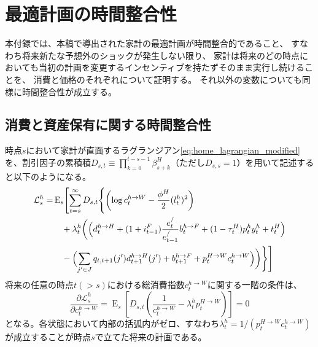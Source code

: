 
\chapter{最適計画の時間整合性}
\label{chap:appendix_time_consistency}

本付録では、本稿で導出された家計の最適計画が時間整合的であること、
すなわち将来新たな予想外のショックが発生しない限り、
家計は将来のどの時点においても当初の計画を変更するインセンティブを持たずそのまま実行し続けることを、
消費と価格のそれぞれについて証明する。
それ以外の変数についても同様に時間整合性が成立する。

\section{消費と資産保有に関する時間整合性}
\label{sec:appendix_time_consistency_sub1}
時点\(s\)において家計が直面するラグランジアン\eqref{eq:home_lagrangian_modified}を、割引因子の累積積\(D_{s,t}\equiv\prod_{k=0}^{t-s-1}\beta_{s+k}^H\)（ただし\(D_{s,s}=1\)）を用いて記述すると以下のようになる。
\begin{equation}
\begin{aligned}
\mathcal{L}_s^h=&\operatorname{E}_s\Biggl[\sum_{t=s}^{\infty}D_{s,t}\Biggl\{\left(\log c_t^{h\to W}-\frac{\phi^H}{2}(l_t^h)^2\right) \\
&\quad+\lambda_t^h\biggl(\Bigl(d_t^{h\to H}+(1+i_{t-1}^F)\frac{e_t^{/}}{e_{t-1}^{/}}b_t^{h\to F}+(1-\tau_t^H)p_t^hy_t^h+t_t^H\Bigr) \\
&\quad-\Bigl(\sum_{j'\in J}q_{t,t+1}(j')d_{t+1}^{h\to H}(j')+b_{t+1}^{h\to F}+p_t^{H\to W}c_t^{h\to W}\Bigr)\biggr)\Biggr\}\Biggr]
\end{aligned}
\label{eq:appendix_time_consistency_sub1_lagrangian_s}
\end{equation}
将来の任意の時点\(t(>s)\)における総消費指数\(c_t^{h\to W}\)に関する一階の条件は、
\begin{equation}
\frac{\partial\mathcal{L}_s^h}{\partial c_t^{h\to W}}=\operatorname{E}_s\left[D_{s,t}\left(\frac{1}{c_t^{h\to W}}-\lambda_t^hp_t^{H\to W}\right)\right]=0
\label{eq:appendix_time_consistency_sub1_foc_s}
\end{equation}
となる。各状態において内部の括弧内がゼロ、すなわち\(\lambda_t^h=1/(p_t^{H\to W}c_t^{h\to W})\)が成立することが時点\(s\)で立てた将来の計画である。



